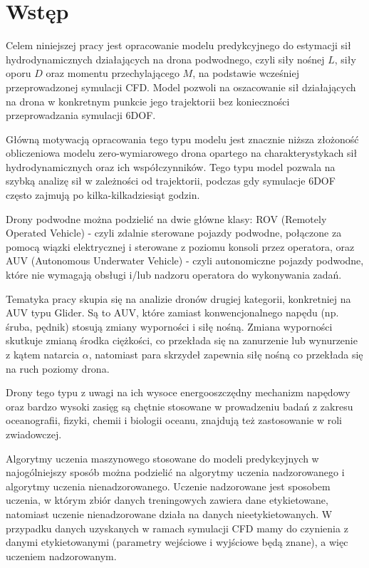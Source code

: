 \section{Wstęp}

Celem niniejszej pracy jest opracowanie modelu predykcyjnego do estymacji sił hydrodynamicznych działających na drona podwodnego, czyli siły nośnej $L$, siły oporu $D$ oraz momentu przechylającego $M$, na podstawie wcześniej przeprowadzonej symulacji CFD. Model pozwoli na oszacowanie sił działających na drona w konkretnym punkcie jego trajektorii bez konieczności przeprowadzania symulacji 6DOF.

Główną motywacją opracowania tego typu modelu jest znacznie niższa złożoność obliczeniowa modelu zero-wymiarowego drona opartego na charakterystykach sił hydrodynamicznych oraz ich współczynników. Tego typu model pozwala na szybką analizę sił w zależności od trajektorii, podczas gdy symulacje 6DOF często zajmują po kilka-kilkadziesiąt godzin. 

Drony podwodne można podzielić na dwie główne klasy: ROV (Remotely Operated Vehicle) - czyli zdalnie sterowane pojazdy podwodne, połączone za pomocą wiązki elektrycznej i sterowane z poziomu konsoli przez operatora, oraz AUV (Autonomous Underwater Vehicle) - czyli autonomiczne pojazdy podwodne, które nie wymagają obsługi i/lub nadzoru operatora do wykonywania zadań.\cite{auv-types}

Tematyka pracy skupia się na analizie dronów drugiej kategorii, konkretniej na AUV typu Glider. Są to AUV, które zamiast konwencjonalnego napędu (np. śruba, pędnik) stosują zmiany wyporności i siłę nośną. Zmiana wyporności skutkuje zmianą środka ciężkości, co przekłada się na zanurzenie lub wynurzenie z kątem natarcia $\alpha$, natomiast para skrzydeł zapewnia siłę nośną co przekłada się na ruch poziomy drona.\cite{seaglider_auv}

Drony tego typu  z uwagi na ich wysoce energooszczędny mechanizm napędowy oraz bardzo wysoki zasięg są chętnie stosowane w prowadzeniu badań z zakresu oceanografii, fizyki, chemii i biologii oceanu, znajdują też zastosowanie w roli zwiadowczej.\cite{auv-types}\cite{seaglider_auv}

Algorytmy uczenia maszynowego stosowane do modeli predykcyjnych w najogólniejszy sposób można podzielić na algorytmy uczenia nadzorowanego i algorytmy uczenia nienadzorowanego.\cite{ibm-ml-1} Uczenie nadzorowane jest sposobem uczenia, w którym zbiór danych treningowych zawiera dane etykietowane, natomiast uczenie nienadzorowane działa na danych nieetykietowanych\cite{ibm-ml-1}\cite{ml-nafali}. W przypadku danych uzyskanych w ramach symulacji CFD mamy do czynienia z danymi etykietowanymi (parametry wejściowe i wyjściowe będą znane), a więc uczeniem nadzorowanym. 

